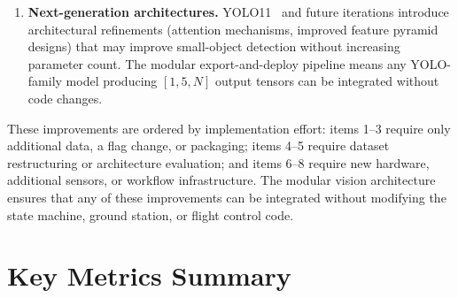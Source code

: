 \documentclass[10pt,a4paper]{article}
\begin{document}
\begin{enumerate}
    \item \textbf{Next-generation architectures.} YOLO11~\cite{yolov8} and future iterations introduce architectural refinements (attention mechanisms, improved feature pyramid designs) that may improve small-object detection without increasing parameter count. The modular export-and-deploy pipeline means any YOLO-family model producing $[1, 5, N]$ output tensors can be integrated without code changes.
\end{enumerate}

These improvements are ordered by implementation effort: items 1--3 require only additional data, a flag change, or packaging; items 4--5 require dataset restructuring or architecture evaluation; and items 6--8 require new hardware, additional sensors, or workflow infrastructure. The modular vision architecture ensures that any of these improvements can be integrated without modifying the state machine, ground station, or flight control code.


\section{Key Metrics Summary}\label{sec:summary}
\end{document}
